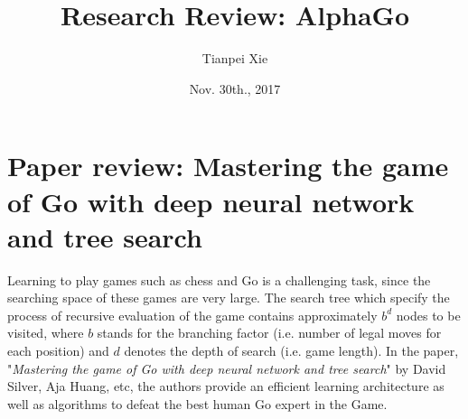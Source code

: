 \documentclass[11pt]{article}
\begin{document}
\title{Research Review: AlphaGo}
\author{ Tianpei Xie}
\date{ Nov. 30th., 2017 }
\maketitle
\section{Paper review: Mastering the game of Go with deep neural network and tree search}
Learning to play games such as chess and Go is a challenging task, since the searching space of these games are very large. The search tree which specify the process of recursive evaluation of the game contains approximately $b^d$ nodes to be visited,  where $b$ stands for the branching factor (i.e. number of legal moves for each position) and $d$ denotes the depth of search (i.e. game length). In the paper, "\emph{Mastering the game of Go with deep neural network and tree search}" by David Silver, Aja Huang, etc, the authors provide an efficient learning architecture as well as algorithms to defeat the best human Go expert in the Game.  
\end{document}
